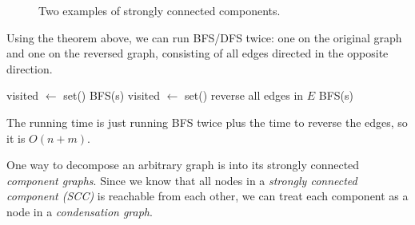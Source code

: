 \begin{definition}
\begin{figure}[H]
\begin{subfigure}[b]{0.48\textwidth}
      \end{subfigure}
      \caption{Two examples of strongly connected components.}
      \label{fig:scc}
    \end{figure}
  \end{definition}

  \begin{algo}
    Using the theorem above, we can run BFS/DFS twice: one on the original graph and one on the reversed graph, consisting of all edges directed in the opposite direction. 
    \begin{algorithm}[H]
      \label{alg:strongly_connected}
      \begin{algorithmic}[1]
          \State visited $\gets$ set() 
          \State BFS(s) 
            \State {}
          \EndIf
          \State visited $\gets$ set() 
          \State reverse all edges in $E$ 
          \State BFS(s) 
            \State {}
          \EndIf
          \State {}
        \EndFunction
      \end{algorithmic}
    \end{algorithm}
    The running time is just running BFS twice plus the time to reverse the edges, so it is $O(n+m)$. 
  \end{algo} 

  One way to decompose an arbitrary graph is into its strongly connected \textit{component graphs}. Since we know that all nodes in a \textit{strongly connected component (SCC)} is reachable from each other, we can treat each component as a node in a \textit{condensation graph}. 

